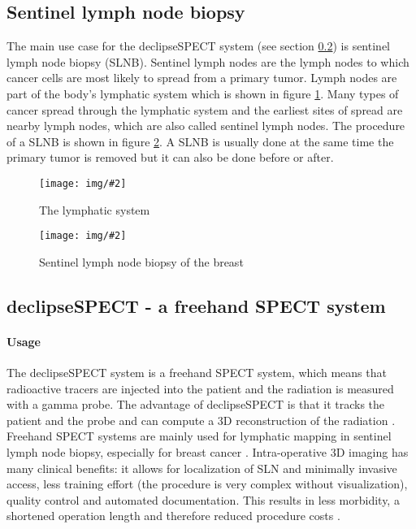 \documentclass{scrartcl}
\newcommand{\red}[1]{{\color{red} #1}}
\newcommand{\graphic}[3][width=\linewidth] %
{
  \begin{figure}[h!t]
    \centering
    \texttt{[image: img/\#2]}
    \caption{#3}
    \label{fig:#2}
  \end{figure}
}
\newcommand{\refFigure}[1]{figure \ref{fig:#1}}
\begin{document}
\subsection{Sentinel lymph node biopsy}
The main use case for the declipseSPECT system (see section \ref{dspect}) is sentinel lymph node biopsy (SLNB). Sentinel lymph nodes are the lymph nodes to which cancer cells are most likely to spread from a primary tumor. Lymph nodes are part of the body's lymphatic system which is shown in \refFigure{lymphatic-system}. Many types of cancer spread through the lymphatic system and the earliest sites of spread are nearby lymph nodes, which are also called sentinel lymph nodes.
The procedure of a SLNB is shown in \refFigure{slnb}. A SLNB is usually done at the same time the primary tumor is removed but it can also be done before or after.
\graphic[scale=.7]{lymphatic-system}{The lymphatic system \cite{bupa}}
\graphic[scale=.7]{slnb}{Sentinel lymph node biopsy of the breast \cite{cancer}}


\subsection{declipseSPECT - a freehand SPECT system}
\label{dspect}
\paragraph*{Usage}
The declipseSPECT system is a freehand SPECT system, which means that radioactive tracers are injected into the patient and the radiation is measured with a gamma probe. The advantage of declipseSPECT is that it tracks the patient and the probe and can compute a 3D reconstruction of the radiation \cite{wendler}.
Freehand SPECT systems are mainly used for lymphatic mapping in sentinel lymph node biopsy, especially for breast cancer \cite{buck}. Intra-operative 3D imaging has many clinical benefits: it allows for localization of SLN and minimally invasive access, less training effort (the procedure is very complex without visualization), quality control and automated documentation. This results in less morbidity, a shortened operation length and therefore reduced procedure costs \cite{surgiceye}.
\end{document}
